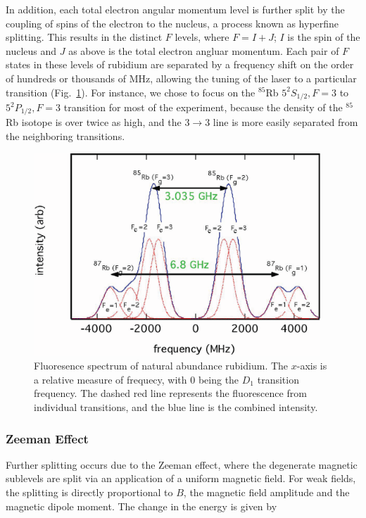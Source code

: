 In addition, each total electron angular momentum level is further
split by the coupling of spins of the electron to the nucleus, a process known
as hyperfine splitting. This results in the distinct $F$ levels, where
$F = I + J$; $I$ is the spin of the nucleus and $J$ as above is the
total electron angluar momentum. Each pair of $F$ states in these
levels of rubidium are separated by a frequency shift on the order of
hundreds or thousands of MHz, allowing the tuning of the laser to a
particular transition (Fig.~\ref{fig:fluor}). For instance, we
chose to focus on the $^{85}$Rb $5^2S_{1/2}, F = 3$ to $5^2P_{1/2}, F
= 3$ transition for most of the experiment, because the density of the
$^{85}$Rb isotope is over twice as high, and the $3\rightarrow3$ line is
more easily separated from the neighboring transitions.

\begin{figure}[h]
\begin{center}
\includegraphics[height=3in]{figures/fluorescence.eps}
\caption{\small{Fluoresence spectrum of natural abundance rubidium. The $x$-axis is a relative measure of frequecy, with $0$ being the $D_1$ transition frequency. The dashed red line represents the fluorescence from individual transitions, and the blue line is the combined intensity.}}
\label{fig:fluor}
\end{center}
\end{figure}


\subsubsection{Zeeman Effect}
Further splitting occurs due to the Zeeman effect, where the degenerate
magnetic sublevels are split via an application of a uniform magnetic
field. For weak fields, the splitting is directly proportional to $B$,
the magnetic field amplitude and the magnetic dipole moment. The
change in the energy is given by

